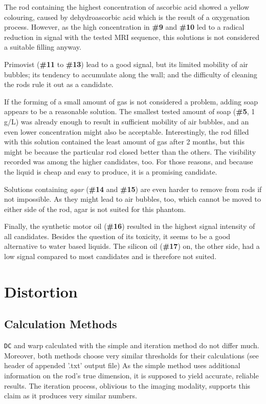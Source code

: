 The rod containing the highest concentration of ascorbic acid showed a yellow colouring, caused by dehydroascorbic acid which is the result of a oxygenation process.
However, as the high concentration in \textbf{\#9} and \textbf{\#10} led to a radical reduction in signal with the tested MRI sequence, this solutions is not considered a suitable filling anyway.

Primovist (\textbf{\#11} to \textbf{\#13}) lead to a good signal, but its limited mobility of air bubbles; its tendency to accumulate along the wall; and the difficulty of cleaning the rods rule it out as a candidate.

If the forming of  a small amount of gas is not considered a problem, adding soap appears to be a reasonable solution.
The smallest tested amount of soap (\textbf{\#5}, 1 g/L) was already enough to result in sufficient mobility of air bubbles, and an even lower concentration might also be acceptable.
Interestingly, the rod filled with this solution contained the least amount of gas after 2 months, but this might be because the particular rod closed better than the others.
The visibility recorded was among the higher candidates, too.
For those reasons, and because the liquid is cheap and easy to produce, it is a promising candidate.

Solutions containing \textit{agar} (\textbf{\#14} and \textbf{\#15}) are even harder to remove from rods if not impossible.
As they might lead to air bubbles, too, which cannot be moved to either side of the rod, agar is not suited for this phantom.

Finally, the synthetic motor oil (\textbf{\#16}) resulted in the highest signal intensity of all candidates.
Besides the question of its toxicity, it seems to be a good alternative to water based liquids.
The silicon oil (\textbf{\#17}) on, the other side, had a low signal compared to most candidates and is therefore not suited.


\section{Distortion}

\subsection{Calculation Methods}
\texttt{DC} and warp calculated with the simple and iteration method do not differ much.
Moreover, both methods choose very similar thresholds for their calculations (see header of appended '.txt' output file)
As the simple method uses additional information on the rod's true dimension, it is supposed to yield accurate, reliable results.
The iteration process, oblivious to the imaging modality, supports this claim as it produces very similar numbers.\\

